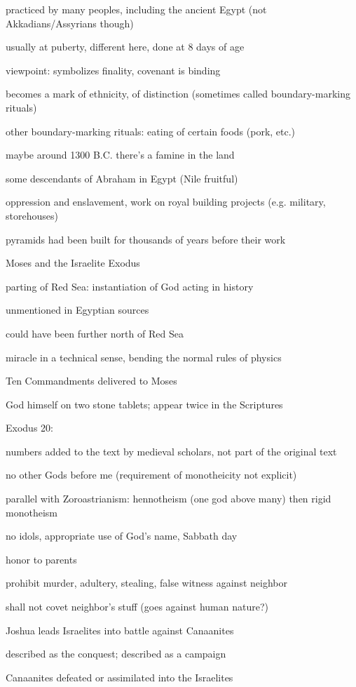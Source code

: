 \documentclass[12pt]{article}
\begin{document}
practiced by many peoples, including the ancient Egypt (not Akkadians/Assyrians though)

usually at puberty, different here, done at 8 days of age

viewpoint: symbolizes finality, covenant is binding

becomes a mark of ethnicity, of distinction (sometimes called boundary-marking rituals)

other boundary-marking rituals: eating of certain foods (pork, etc.)

\noindent
maybe around 1300 B.C. there's a famine in the land

some descendants of Abraham in Egypt (Nile fruitful)

oppression and enslavement, work on royal building projects (e.g. military, storehouses)

pyramids had been built for thousands of years before their work

\noindent
Moses and the Israelite Exodus

parting of Red Sea: instantiation of God acting in history

unmentioned in Egyptian sources

could have been further north of Red Sea

miracle in a technical sense, bending the normal rules of physics

Ten Commandments delivered to Moses

God himself on two stone tablets; appear twice in the Scriptures

\noindent
Exodus 20:

numbers added to the text by medieval scholars, not part of the original text

no other Gods before me (requirement of monotheicity not explicit)

parallel with Zoroastrianism: hennotheism (one god above many) then rigid monotheism

no idols, appropriate use of God's name, Sabbath day

honor to parents

prohibit murder, adultery, stealing, false witness against neighbor

shall not covet neighbor's stuff (goes against human nature?)

\noindent
Joshua leads Israelites into battle against Canaanites

described as the conquest; described as a campaign

Canaanites defeated or assimilated into the Israelites
\end{document}
